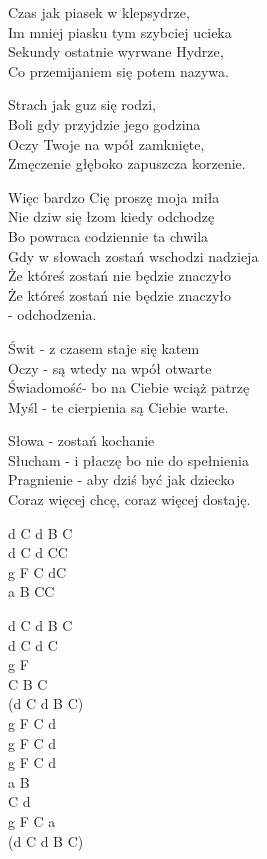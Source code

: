 \begin{text}
    Czas jak piasek w klepsydrze,\\
    Im mniej piasku tym szybciej ucieka\\
    Sekundy ostatnie wyrwane Hydrze,\\
    Co przemijaniem się potem nazywa.

    Strach jak guz się rodzi,\\
    Boli gdy przyjdzie jego godzina\\
    Oczy Twoje na wpół zamknięte,\\
    Zmęczenie głęboko zapuszcza korzenie.

    Więc bardzo Cię proszę moja miła\\
    Nie dziw się łzom kiedy odchodzę\\
    Bo powraca codziennie ta chwila\\
    Gdy w słowach zostań wschodzi nadzieja\\
    Że któreś zostań nie będzie znaczyło\\
    Że któreś zostań nie będzie znaczyło\\
    - odchodzenia.

    Świt - z czasem staje się katem\\
    Oczy - są wtedy na wpół otwarte\\
    Świadomość- bo na Ciebie wciąż patrzę\\
    Myśl - te cierpienia są Ciebie warte.

    Słowa - zostań kochanie\\
    Słucham - i płaczę bo nie do spełnienia\\
    Pragnienie - aby dziś być jak dziecko\\
    Coraz więcej chcę, coraz więcej dostaję.
\end{text}
\begin{chord}
    d C d B C\\
    d C	d CC\\
    g F	C dC\\
    a B	CC

    d C	d B C\\
    d C	d C\\
    g F\\
    C B	C\\
    (d C d B C)\\
    g F	C d\\
    g F	C d\\
    g F	C d\\
    a B\\
    C d\\
    g F	C a\\
    (d C d B C)
\end{chord}
